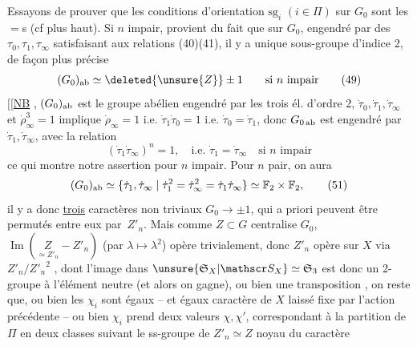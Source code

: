  Essayons de prouver que les conditions
d'orientation  $\mathrm{sg}_i$ $(i\in\Pi)$ sur $G_0$ sont les $=$s (cf plus haut). Si $n$ impair,  provient du fait que sur $G_0$, engendré par des  $\tau_0,\tau_1,\tau_\infty$ satisfaisant aux relations (40)(41), il y a  unique sous-groupe d'indice 2, de façon plus précise
\[
 (G_0)_{\rm ab}\simeq \deleted{\unsure{Z}}\pm1 \qquad\text{si }n\text{ impair}
 \tag*{(49)}
\]
$[\![$\uline{NB} , $(G_0)_{\rm ab}$ est  le groupe abélien engendré par les trois él. d'ordre 2, $\dot\tau_0,\dot\tau_1,\dot\tau_\infty$  et $\dot\rho_\infty^3=1$  implique $\dot\rho_\infty=1$ i.e. $\dot\tau_1\dot\tau_0=1$ i.e. $\dot\tau_0=\dot\tau_1$, donc $G_{0\,\rm ab}$ est engendré par $\dot\tau_1,\dot\tau_\infty$, avec la relation
\[
(\dot\tau_1\dot\tau_\infty)^n=1,\quad\text{i.e. }\dot\tau_1=\dot\tau_\infty\quad\text{si }n\text{ impair}
\tag*{(50)}
\]
ce qui montre notre assertion pour $n$ impair. Pour $n$ pair, on aura
\[
(G_0)_{\rm ab}\simeq\{\dot\tau_1,\dot\tau_\infty\mid\dot\tau_1^2=\dot\tau_\infty^2=\dot\tau_1\dot\tau_\infty\}\simeq\mathbb F_2\times\mathbb F_2,\tag*{(51)}
\]
il y a donc  \uline{trois} caractères  non triviaux $G_0\longrightarrow\pm1$, qui a priori peuvent être permutés entre eux par \,$Z'_n$. Mais comme $Z\subset G$ centralise $G_0$, $\operatorname{Im}(\underset{\simeq Z'_n}{Z}\mathrel{-}Z'_n)$ (par $\lambda\longmapsto\lambda^2$) opère trivialement, donc $Z'_n$ opère sur $X$ via
$Z'_n/{Z'_n}^2$ , dont l'image dans $\unsure{\mathfrak S_X|\mathscr S_X}\simeq\mathfrak S_3$ est donc un 2-groupe  à l'élément neutre (et alors on gagne), ou bien une transposition , on reste
que, ou bien les $\chi_i$ sont égaux -- et  égaux  caractère de $X$ laissé fixe par l'action précédente -- ou bien $\chi_i$ prend deux valeurs $\chi,\chi'$, correspondant à  la partition de $\Pi$ en deux classes suivant le  ss-groupe de $Z'_n\simeq Z$ noyau du caractère
